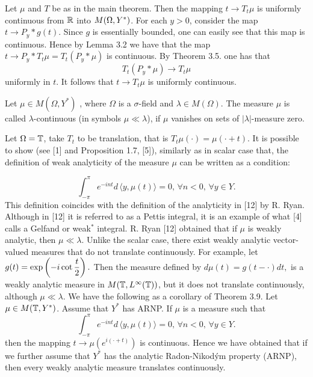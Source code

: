    Let $\mu$ and $T$ be as in the main theorem.
Then the mapping $t\to T_t\mu$ is uniformly continuous from $\Bbb R$
into $M(\Omega, Y^*)$. \endproclaim
\prf For each $y>0$, consider the map $t\to P_y\ast g(t)$. Since
$g$ is essentially bounded, one can easily see that this map is
continuous. Hence by Lemma 3.2 we have  that the map $t\to P_y\ast
T_t\mu=T_t(P_y\ast\mu )$ is continuous. By Theorem 3.5. one has
that
$$ T_t (P_y\ast \mu)\to T_t \mu$$
uniformly in $t$. It follows that
$t\to T_t\mu$ is uniformly continuous.\endprf

  Let $\mu \in M(\Omega,Y^*)$ ,
where $\Omega $
 is a $\sigma$-field and $\lambda\in M(\Omega)$. The measure $\mu$
is called
 $\lambda$-continuous (in symbols $\mu \ll\lambda$), if $\mu$
vanishes on sets
of
$|\lambda|$-measure zero. \enddefinition

   Let $\Omega =\Bbb T$, take $T_t$ to be translation, that is
$T_t\mu(\cdot) =\mu(\cdot +t)$. It is possible to show
 (see [1] and Proposition 1.7, [5]), similarly as in scalar case  that,
the definition of weak analyticity of the measure $\mu$ can be
written as a
 condition:

$$
 \int_{-\pi}^{\pi} e^{-int} d \,\langle y,\mu(t)\rangle =0, \,\forall
 n<0,\,\forall y\in Y.$$
This definition coincides with the definition of the analyticity in
[12] by R.
 Ryan.
Although in [12] it is referred to as a Pettis integral, it is an
example of
 what [4] calls a Gelfand or weak$^*$ integral.
R. Ryan [12] obtained
that if $\mu$ is  weakly analytic, then $\mu \ll \lambda$. Unlike
the scalar
case, there exist weakly analytic vector-valued measures that do
not translate
continuously. For example, let $g(t)=\exp\left({\displaystyle{-i \cot
 \displaystyle{t\over 2}}}\right).$
Then the measure defined by
$d\mu(t)=g(t-\cdot) dt,$ is a weakly
analytic measure in $M(\Bbb T,L^{\infty}(\Bbb T))$, but it does not
translate continuously, although $\mu \ll\lambda$.
We have the following as a corollary of Theorem 3.9.
 Let  $\mu \in M(\Bbb T,Y^*)$. Assume that
$Y^*$ has
ARNP.
If  $\mu$ is a measure such that
$$
 \int_{-\pi}^{\pi} e^{-int} d \,\langle y,\mu  (t)\rangle =0, \,\forall
 n<0,\,\forall y\in Y.$$
then  the mapping  $t\to\mu(e^{i(\cdot +t)})$ is continuous.
\endproclaim
Hence we have obtained that if we further assume that $Y^*$
has the analytic Radon-Nikod\'ym property (ARNP), then every weakly
analytic measure translates continuously.



\Refs

